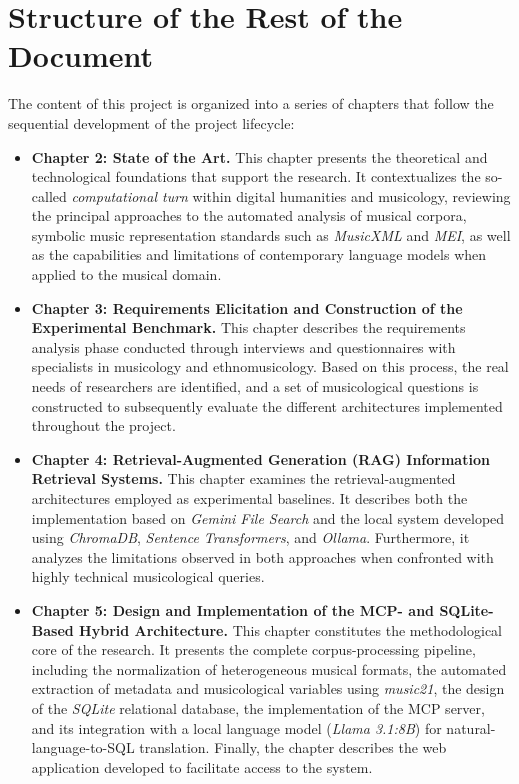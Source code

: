 \section{Structure of the Rest of the Document}
The content of this project is organized into a series of chapters that follow the sequential development of the project lifecycle:

\begin{itemize}
\item \textbf{Chapter 2: State of the Art.} This chapter presents the theoretical and technological foundations that support the research. It contextualizes the so-called \textit{computational turn} within digital humanities and musicology, reviewing the principal approaches to the automated analysis of musical corpora, symbolic music representation standards such as \textit{MusicXML} and \textit{MEI}, as well as the capabilities and limitations of contemporary language models when applied to the musical domain.
\item \textbf{Chapter 3: Requirements Elicitation and Construction of the Experimental Benchmark.} This chapter describes the requirements analysis phase conducted through interviews and questionnaires with specialists in musicology and ethnomusicology. Based on this process, the real needs of researchers are identified, and a set of musicological questions is constructed to subsequently evaluate the different architectures implemented throughout the project.
\item \textbf{Chapter 4: Retrieval-Augmented Generation (RAG) Information Retrieval Systems.} This chapter examines the retrieval-augmented architectures employed as experimental baselines. It describes both the implementation based on \textit{Gemini File Search} and the local system developed using \textit{ChromaDB}, \textit{Sentence Transformers}, and \textit{Ollama}. Furthermore, it analyzes the limitations observed in both approaches when confronted with highly technical musicological queries.
\item \textbf{Chapter 5: Design and Implementation of the MCP- and SQLite-Based Hybrid Architecture.} This chapter constitutes the methodological core of the research. It presents the complete corpus-processing pipeline, including the normalization of heterogeneous musical formats, the automated extraction of metadata and musicological variables using \textit{music21}, the design of the \textit{SQLite} relational database, the implementation of the MCP server, and its integration with a local language model (\textit{Llama 3.1:8B}) for natural-language-to-SQL translation. Finally, the chapter describes the web application developed to facilitate access to the system.

\end{itemize}
